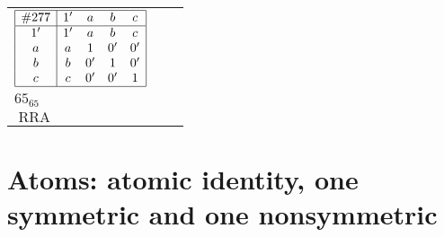 \documentclass[12pt]{article}
\newcommand\RRA{\operatorname{RRA}}
\newcommand{\id}{{1'}}%
\renewcommand{\div}{0'}
\renewcommand{\top}{1}%
\begin{document}
\begin{center}
\begin{longtable}{l|c|c}
$
\begin{array}{|c|cccc|} \hline
\#277 & \id & a & b & c \\ \hline
\id & \id & a & b & c \\
a & a & \top & \div & \div \\
b & b & \div & \top & \div \\
c & c & \div & \div & \top \\ \hline
\end{array}
$
 & \begin{tabular}{c} yes \\ $65_{65}$ \\ $\RRA$ \end{tabular} 
 & \adjustbox{valign=c, max height=1.6cm}{$
\left[ \begin{array}{cccccc}
\id & a & a & b & c & c \\ 
a & \id & a & a & a & c \\ 
a & a & \id & b & b & c \\ 
b & a & b & \id & b & c \\ 
c & a & b & b & \id & c \\ 
c & c & c & c & c & \id
\end{array}\right]
$}      \\[15mm]

\end{longtable}
\end{center}

\section[Atomic identity, one symmetric, one nonsymmetric]{Atoms: atomic identity, one symmetric and one nonsymmetric}
\end{document}
